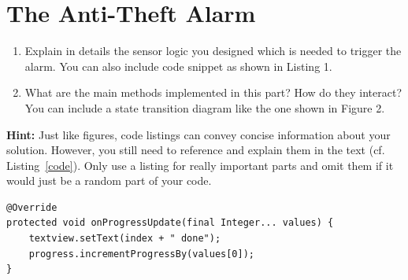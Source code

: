 \documentclass{report}
\newcommand{\lfig}[1]{\label{fig:#1}}
\newcommand{\rlst}[1]{Listing~\ref{#1}}
\begin{document}




\section{The Anti-Theft Alarm}

\begin{enumerate}
  \item Explain in details the sensor logic you designed which is needed to trigger the alarm. You can also include code snippet as shown in Listing 1.
  \item What are the main methods implemented in this part? How do they interact? You can include a state transition diagram like the one shown in Figure 2.
\end{enumerate}

\textbf{Hint:} Just like figures, code listings can convey concise information about your solution.
However, you still need to reference and explain them in the text (cf. \rlst{code}).
Only use a listing for really important parts and omit them if it would just be a random part of your code.

\begin{lstlisting}
@Override
protected void onProgressUpdate(final Integer... values) {
	textview.setText(index + " done");
	progress.incrementProgressBy(values[0]);
}
\end{lstlisting}
\end{document}
